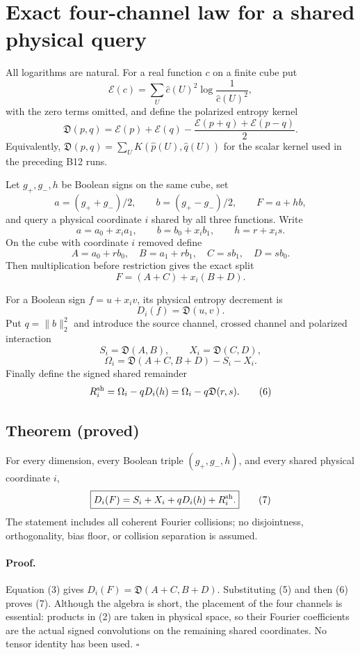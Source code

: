 \section*{Exact four-channel law for a shared physical query}

All logarithms are natural.  For a real function $c$ on a finite cube put
\[
 \mathcal E(c)=\sum_U \widehat c(U)^2
      \log\frac1{\widehat c(U)^2},
\]
with the zero terms omitted, and define the polarized entropy kernel
\[
 \mathfrak D(p,q)=\mathcal E(p)+\mathcal E(q)
 -\frac{\mathcal E(p+q)+\mathcal E(p-q)}2.
\tag{1}
\]
Equivalently, $\mathfrak D(p,q)=\sum_U K(\widehat p(U),\widehat
q(U))$ for the scalar kernel used in the preceding B12 runs.

Let $g_+,g_-,h$ be Boolean signs on the same cube, set
\[
 a=(g_++g_-)/2,\qquad b=(g_+-g_-)/2,\qquad F=a+hb,
\]
and query a physical coordinate $i$ shared by all three functions.  Write
\[
 a=a_0+x_i a_1,\qquad b=b_0+x_i b_1,\qquad h=r+x_i s.
\]
On the cube with coordinate $i$ removed define
\[
 A=a_0+r b_0,\quad B=a_1+r b_1,\quad
 C=s b_1,\quad D=s b_0.                                      \tag{2}
\]
Then multiplication before restriction gives the exact split
\[
 F=(A+C)+x_i(B+D).                                           \tag{3}
\]

For a Boolean sign $f=u+x_i v$, its physical entropy decrement is
\[
 D_i(f)=\mathfrak D(u,v).
\]
Put $q=\|b\|_2^2$ and introduce the source channel, crossed channel and
polarized interaction
\[
 S_i=\mathfrak D(A,B),\qquad X_i=\mathfrak D(C,D),             \tag{4}
\]
\[
 \Omega_i=\mathfrak D(A+C,B+D)-S_i-X_i.                       \tag{5}
\]
Finally define the signed shared remainder
\[
 R_i^{\rm sh}=\Omega_i-qD_i(h)
              =\Omega_i-q\mathfrak D(r,s).                    \tag{6}
\]

\subsection*{Theorem (proved)}

For every dimension, every Boolean triple $(g_+,g_-,h)$, and every shared
physical coordinate $i$,
\[
 \boxed{D_i(F)=S_i+X_i+qD_i(h)+R_i^{\rm sh}.}                 \tag{7}
\]
The statement includes all coherent Fourier collisions; no disjointness,
orthogonality, bias floor, or collision separation is assumed.

\paragraph{Proof.}
Equation (3) gives $D_i(F)=\mathfrak D(A+C,B+D)$.  Substituting (5) and
then (6) proves (7).  Although the algebra is short, the placement of the
four channels is essential: products in (2) are taken in physical space, so
their Fourier coefficients are the actual signed convolutions on the
remaining shared coordinates.  No tensor identity has been used. \(\square\)

